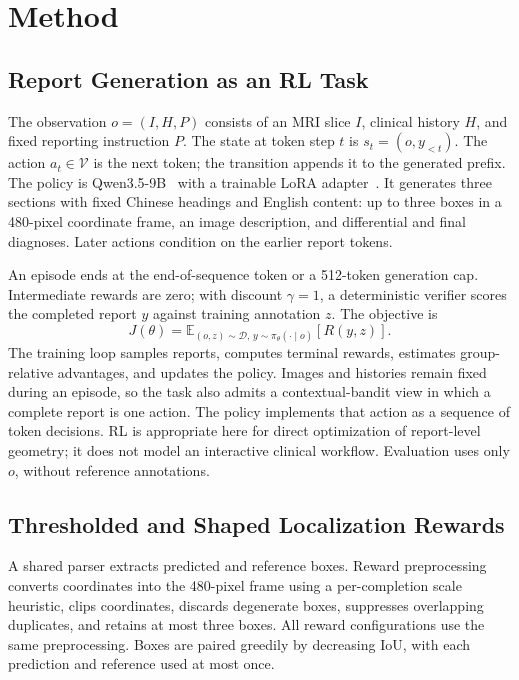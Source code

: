 \documentclass[conference]{IEEEtran}
\begin{document}
\section{Method}
\subsection{Report Generation as an RL Task}
The observation $o=(I,H,P)$ consists of an MRI slice $I$, clinical history $H$, and fixed reporting instruction $P$. The state at token step $t$ is $s_t=(o,y_{<t})$. The action $a_t\in\mathcal V$ is the next token; the transition appends it to the generated prefix. The policy is Qwen3.5-9B~\cite{qwen35} with a trainable LoRA adapter~\cite{lora}. It generates three sections with fixed Chinese headings and English content: up to three boxes in a 480-pixel coordinate frame, an image description, and differential and final diagnoses. Later actions condition on the earlier report tokens.

An episode ends at the end-of-sequence token or a 512-token generation cap. Intermediate rewards are zero; with discount $\gamma=1$, a deterministic verifier scores the completed report $y$ against training annotation $z$. The objective is
\begin{equation}
 J(\theta)=\mathbb E_{(o,z)\sim\mathcal D,\,y\sim\pi_\theta(\cdot\mid o)}[R(y,z)].
\end{equation}
The training loop samples reports, computes terminal rewards, estimates group-relative advantages, and updates the policy. Images and histories remain fixed during an episode, so the task also admits a contextual-bandit view in which a complete report is one action. The policy implements that action as a sequence of token decisions. RL is appropriate here for direct optimization of report-level geometry; it does not model an interactive clinical workflow. Evaluation uses only $o$, without reference annotations.

\subsection{Thresholded and Shaped Localization Rewards}
A shared parser extracts predicted and reference boxes. Reward preprocessing converts coordinates into the 480-pixel frame using a per-completion scale heuristic, clips coordinates, discards degenerate boxes, suppresses overlapping duplicates, and retains at most three boxes. All reward configurations use the same preprocessing. Boxes are paired greedily by decreasing IoU, with each prediction and reference used at most once.
\end{document}

